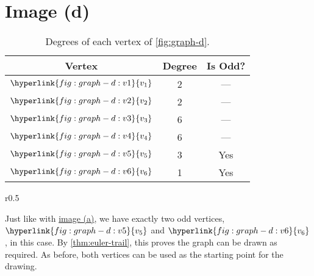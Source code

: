 \section{Image (d)}

\begin{table}[H]
    \caption{Degrees of each vertex of \cref{fig:graph-d}.}
    \label{tab:graph-d}

    \centering
    \begin{tabular}{ccc}
        \toprule
        \toprule
            Vertex & Degree & Is Odd? \\
        \midrule
            $\hyperlink{fig:graph-d:v1}{v_1}$ & 2 & --- \\
            $\hyperlink{fig:graph-d:v2}{v_2}$ & 2 & --- \\
            $\hyperlink{fig:graph-d:v3}{v_3}$ & 6 & --- \\
            $\hyperlink{fig:graph-d:v4}{v_4}$ & 6 & --- \\
            $\hyperlink{fig:graph-d:v5}{v_5}$ & 3 & Yes \\
            $\hyperlink{fig:graph-d:v6}{v_6}$ & 1 & Yes \\
        \bottomrule
        \bottomrule
    \end{tabular}
\end{table}

\begin{wrapfigure}{r}{0.5\textwidth}
    \centering
    

    \caption{Image \texttt{d.} with labelled nodes.}
    \label{fig:graph-d}
\end{wrapfigure}

Just like with \hyperref[sec:graph-a]{image (a)}, we have exactly two odd vertices, $\hyperlink{fig:graph-d:v5}{v_5}$ and $\hyperlink{fig:graph-d:v6}{v_6}$, in this case. By \cref{thm:euler-trail}, this proves the graph can be drawn as required. As before, both vertices can be used as the starting point for the drawing.
